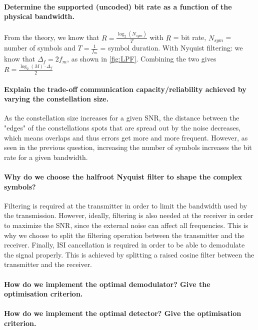 \paragraph{Determine the supported (uncoded) bit rate as a function of the physical bandwidth.} From the theory, we know that $R = \frac{\log_2(N_{sym})}{T}$ with $R$ = bit rate, $N_{sym}$ = number of symbols and $T = \frac{1}{f_m}$ = symbol duration.
With Nyquist filtering: we know that $\Delta_f = 2f_m$, as shown in \ref{fig:LPF}.
Combining the two gives $R = \frac{\log_2(M)\cdot\Delta_f}{2}$
\paragraph{Explain the trade-off communication capacity/reliability achieved by varying the constellation size.}
As the constellation size increases for a given SNR, the distance between the "edges" of the constellations spots that are spread out by the noise decreases, which means overlaps and thus errors get more and more frequent.
However, as seen in the previous question, increasing the number of symbols increases the bit rate for a given bandwidth.
\paragraph{Why do we choose the halfroot Nyquist filter to shape the complex symbols?}
Filtering is required at the transmitter in order to limit the bandwidth used by the transmission.
However, ideally, filtering is also needed at the receiver in order to maximize the SNR, since the external noise can affect all frequencies.
This is why we choose to split the filtering operation between the transmitter and the receiver.
Finally, ISI cancellation is required in order to be able to demodulate the signal properly.
This is achieved by splitting a raised cosine filter between the transmitter and the receiver.
\paragraph{How do we implement the optimal demodulator? Give the optimisation criterion.}


\paragraph{How do we implement the optimal detector? Give the optimisation criterion.}
